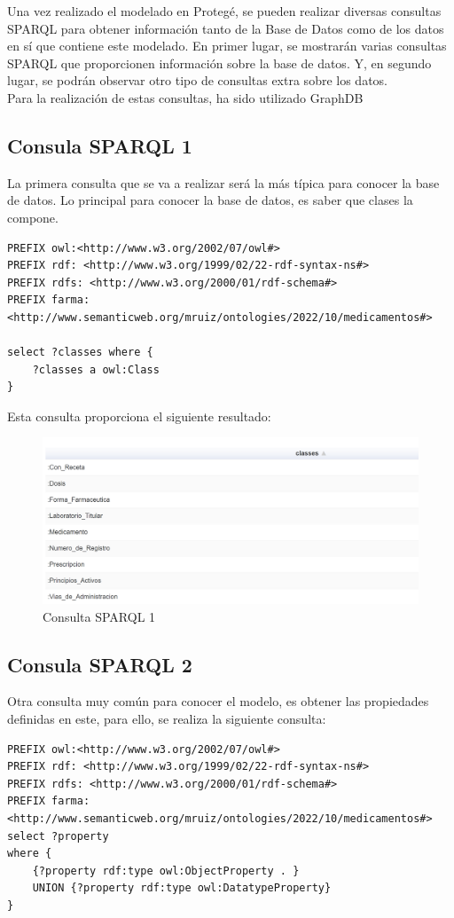 \documentclass[../main.tex]{subfiles}
\begin{document}
Una vez realizado el modelado en Protegé, se pueden realizar diversas consultas SPARQL para obtener información tanto de la Base de Datos como de los datos en sí que contiene este modelado. En primer lugar, se mostrarán varias consultas SPARQL que proporcionen información sobre la base de datos. Y, en segundo lugar, se podrán observar otro tipo de consultas extra sobre los datos. \\

Para la realización de estas consultas, ha sido utilizado GraphDB
\subsection{Consula SPARQL 1}
La primera consulta que se va a realizar será la más típica para conocer la base de datos. Lo principal para conocer la base de datos, es saber que clases la compone.
\begin{lstlisting}
PREFIX owl:<http://www.w3.org/2002/07/owl#>
PREFIX rdf: <http://www.w3.org/1999/02/22-rdf-syntax-ns#>
PREFIX rdfs: <http://www.w3.org/2000/01/rdf-schema#>
PREFIX farma: <http://www.semanticweb.org/mruiz/ontologies/2022/10/medicamentos#>

select ?classes where {
    ?classes a owl:Class
}
\end{lstlisting}
Esta consulta proporciona el siguiente resultado:
\begin{figure}[h]
    \centering
    \includegraphics[scale=0.2]{images/clases_sparql.png}
    \caption{Consulta SPARQL 1}
    \label{fig:mesh1}
\end{figure}

\subsection{Consula SPARQL 2}
Otra consulta muy común para conocer el modelo, es obtener las propiedades definidas en este, para ello, se realiza la siguiente consulta:
\begin{lstlisting}
PREFIX owl:<http://www.w3.org/2002/07/owl#>
PREFIX rdf: <http://www.w3.org/1999/02/22-rdf-syntax-ns#>
PREFIX rdfs: <http://www.w3.org/2000/01/rdf-schema#>
PREFIX farma: <http://www.semanticweb.org/mruiz/ontologies/2022/10/medicamentos#>
select ?property
where { 
    {?property rdf:type owl:ObjectProperty . }
    UNION {?property rdf:type owl:DatatypeProperty}
}
\end{lstlisting}
\end{document}
